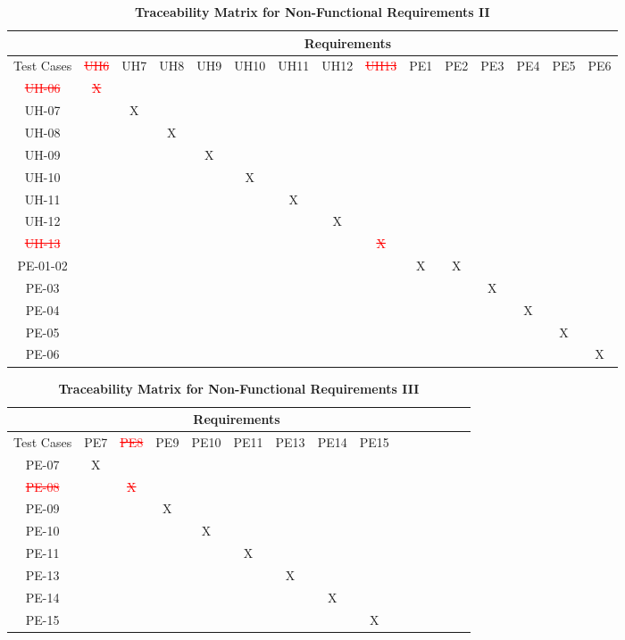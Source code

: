 \documentclass[12pt, titlepage]{article}
\begin{document}
\begin{landscape}
\begin{table}[h!]
\centering
\caption{\textbf{Traceability Matrix for Non-Functional Requirements II}}
\label{tab:trace_matrix_03}
\begin{tabular}{|c|c|c|c|c|c|c|c|c|c|c|c|c|c|c|}
\hline
& \multicolumn{14}{c|}{Requirements} \\
\hline
Test Cases & \textcolor{red}{\sout{UH6}} & UH7 & UH8 & UH9 & UH10 & UH11 & UH12 & \textcolor{red}{\sout{UH13}} & PE1 & PE2 & PE3 & PE4 & PE5 & PE6 \\
\hline
\textcolor{red}{\sout{UH-06}} & \textcolor{red}{\sout{X}} & & & & & & & & & & & & & \\
\hline
UH-07 & & X & & & & & & & & & & & & \\
\hline
UH-08 & & & X & & & & & & & & & & & \\
\hline
UH-09 & & & & X & & & & & & & & & & \\
\hline
UH-10 & & & & & X & & & & & & & & & \\
\hline
UH-11 & & & & & & X & & & & & & & & \\
\hline
UH-12 & & & & & & & X & & & & & & & \\
\hline
\textcolor{red}{\sout{UH-13}} & & & & & & & & \textcolor{red}{\sout{X}} & & & & & & \\
\hline
PE-01-02 & & & & & & & & & X & X & & & & \\
\hline
PE-03 & & & & & & & & & & & X & & & \\
\hline
PE-04 & & & & & & & & & & & & X & & \\
\hline
PE-05 & & & & & & & & & & & & & X & \\
\hline
PE-06 & & & & & & & & & & & & & & X \\
\hline
\end{tabular}
\end{table}

\newpage

\begin{table}[h!]
\centering
\caption{\textbf{Traceability Matrix for Non-Functional Requirements III}}
\label{tab:trace_matrix_03}
\begin{tabular}{|c|c|c|c|c|c|c|c|c|c|c|c|c|c|c|}
\hline
& \multicolumn{8}{c|}{Requirements} \\
\hline
Test Cases & PE7 & \textcolor{red}{\sout{PE8}} & PE9 & PE10 & PE11 & PE13 & PE14 & PE15 \\
\hline
PE-07 & X & & & & & & & \\
\hline
\textcolor{red}{\sout{PE-08}} & & \textcolor{red}{\sout{X}} & & & & & & \\
\hline
PE-09 & & & X & & & & & \\
\hline
PE-10 & & & & X & & & & \\
\hline
PE-11 & & & & & X & & & \\
\hline
PE-13 & & & & & & X & & \\
\hline
PE-14 & & & & & & & X & \\
\hline
PE-15 & & & & & & & & X \\
\hline
\end{tabular}
\end{table}

\end{landscape}
\end{document}
